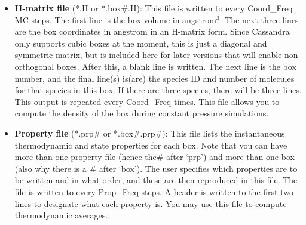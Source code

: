 \begin{itemize}
\item {\bf H-matrix file} (*.H or *.box\#.H): This file is written to every Coord\_Freq MC steps. The first line is the box volume in angstrom$^3$. The next three lines are the box coordinates in angstrom in an H-matrix form. Since Cassandra only supports cubic boxes at the moment, this is just a diagonal and symmetric matrix, but is included here for later versions that will enable non-orthogonal boxes. After this, a blank line is written. The next line is the box number, and the final line(s) is(are) the species ID and number of molecules for that species in this box. If there are three species, there will be three lines. This output is repeated every Coord\_Freq times. This file allows you to compute the density of the box during constant pressure simulations.  


\item{{\bf Property file}} (*.prp\# or *.box\#.prp\#): This file lists the instantaneous thermodynamic and state properties for each box. Note that you can have more than one property file (hence the\# after `prp') and more than one box (also why there is a \# after `box'). The user specifies which properties are to be written and in what order, and these are then reproduced in this file. The file is written to every Prop\_Freq steps. A header is written to the first two lines to designate what each property is. You may use this file to compute thermodynamic averages.

\end{itemize}
